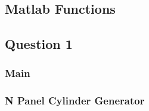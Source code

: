 \begin{appendix}

\section{Matlab Functions}

\subsection{Question 1} \label{ap:qn1}

\subsubsection*{Main}
 \label{ap:main_qn1}

\subsubsection*{N Panel Cylinder Generator}
 \label{ap:n_pan_cyl}



\end{appendix}
